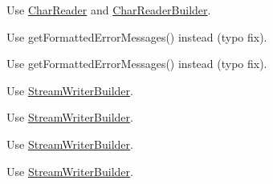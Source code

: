 
\begin{DoxyRefList}
\item[\label{deprecated__deprecated000005}%
\Hypertarget{deprecated__deprecated000005}%
Member \hyperlink{namespaceJson_a61b556ffe4c70c4492a9dbe4718ec50b_a61b556ffe4c70c4492a9dbe4718ec50b}{Json\+:\+:J\+S\+O\+N\+C\+P\+P\+\_\+\+D\+E\+P\+R\+E\+C\+A\+T\+ED} (\char`\"{}\+Use Char\+Reader and Char\+Reader\+Builder instead\char`\"{}) J\+S\+O\+N\+\_\+\+A\+PI Reader]Use \hyperlink{classJson_1_1CharReader}{Char\+Reader} and \hyperlink{classJson_1_1CharReaderBuilder}{Char\+Reader\+Builder}. 

Use get\+Formatted\+Error\+Messages() instead (typo fix). 

Use get\+Formatted\+Error\+Messages() instead (typo fix).  
\item[\label{deprecated__deprecated000008}%
\Hypertarget{deprecated__deprecated000008}%
Member \hyperlink{namespaceJson_a9013c5f4f4ff260225b101a18af45262_a9013c5f4f4ff260225b101a18af45262}{Json\+:\+:J\+S\+O\+N\+C\+P\+P\+\_\+\+D\+E\+P\+R\+E\+C\+A\+T\+ED} (\char`\"{}\+Use Stream\+Writer\+Builder instead\char`\"{}) J\+S\+O\+N\+\_\+\+A\+PI Styled\+Stream\+Writer]Use \hyperlink{classJson_1_1StreamWriterBuilder}{Stream\+Writer\+Builder}. 

Use \hyperlink{classJson_1_1StreamWriterBuilder}{Stream\+Writer\+Builder}. 

Use \hyperlink{classJson_1_1StreamWriterBuilder}{Stream\+Writer\+Builder}. 

Use \hyperlink{classJson_1_1StreamWriterBuilder}{Stream\+Writer\+Builder}. 


\end{DoxyRefList}
